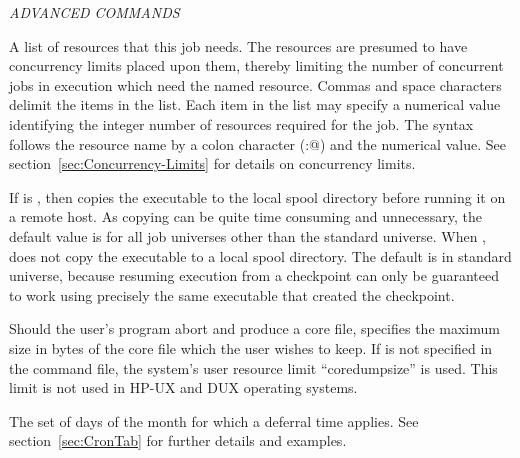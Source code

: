 \emph{ADVANCED COMMANDS}
\begin{description} 

\item[concurrency\_limits = $<$string-list$>$]
A list of resources that this job needs.
The resources are presumed to have concurrency limits placed upon them,
thereby limiting the number of concurrent jobs in execution which
need the named resource.
Commas and space characters delimit the items in the list.
Each item in the list may specify a numerical value identifying the integer
number of resources required for the job.
The syntax follows the resource name by a colon character (\verb@:@)
and the numerical value.
See section~\ref{sec:Concurrency-Limits} for details on concurrency limits.


\item[copy\_to\_spool = $<$True \Bar\ False$>$]
If  is ,
then  copies the executable to the local spool 
directory before running it on a remote host. 
As copying can be quite time consuming and unnecessary,
the default value is  for all job universes
other than the standard universe. 
When ,  does not copy the executable
to a local spool directory.
The default is  in standard universe, because
resuming execution from a checkpoint can only be guaranteed to work using
precisely the same executable that created the checkpoint.


\item[coresize = $<$size$>$] Should the user's program abort and produce
a core file,  specifies the maximum size in bytes of the
core file which the user wishes to keep. If  is not
specified in the command file, the system's user resource limit
\mbox{``coredumpsize''} is used.
This limit is not used in HP-UX and DUX operating systems. 

\item[cron\_day\_of\_month = $<$Cron-evaluated Day$>$]
The set of days of the month for which a deferral time applies.
See section~\ref{sec:CronTab} for further details and examples.


\end{description}
